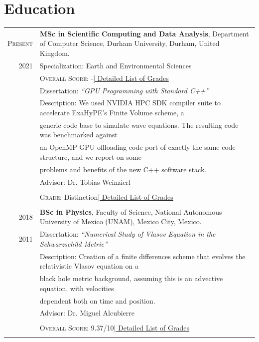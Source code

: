 \documentclass[a4paper,10pt]{article} %
\begin{document}
\section{Education}
\bigskip
\begin{tabular}{r|p{14.5cm}}	
	
	\textsc{Present} & \textbf{MSc in Scientific Computing and Data Analysis}, Department of Computer Science, Durham University, \small Durham, United Kingdom.\\
	\textsc{2021} & Specialization: Earth and Environmental Sciences\\
	&\normalsize \textsc{Overall Score}: -\hyperlink{grdsmsc}{\hfill | \footnotesize Detailed List of Grades}\\
	& Dissertation: \emph{``GPU Programming with Standard C++''}\\ 
	& \small Description: We used NVIDIA HPC SDK compiler suite to accelerate ExaHyPE's Finite Volume scheme, a\\
	&\hspace{1.7cm} \small generic code base to simulate wave equations. The resulting code was benchmarked against\\
	&\hspace{1.7cm} an OpenMP GPU offloading code port of exactly the same code structure, and we report on some\\
	&\hspace{1.7cm} problems and benefits of the new C++ software stack.\\
	& \small Advisor: Dr. Tobias Weinzierl\\
	& \\
	&\normalsize \textsc{Grade}: Distinction\hyperlink{grdsbach}{\hfill | \footnotesize Detailed List of Grades}\\
	\multicolumn{2}{c}{}\\

	
	\textsc{2018} & \textbf{BSc in Physics}, Faculty of Science, National Autonomous University of Mexico (UNAM), \small Mexico City, Mexico.\\
	\textsc{2011} & Dissertation: \emph{``Numerical Study of Vlasov Equation in the Schwarzschild Metric''}\\
	&\small Description: Creation of a finite differences scheme that evolves the relativistic Vlasov equation on a\\
	&\hspace{1.7cm} \small black hole metric background, assuming this is an advective equation, with velocities \\
	&\hspace{1.7cm} \small dependent both on time and position.\\
	& \small Advisor: Dr. Miguel Alcubierre\\
	& \\
	&\normalsize \textsc{Overall Score}: 9.37/10\hyperlink{grdsbach}{\hfill | \footnotesize Detailed List of Grades}\\
	\multicolumn{2}{c}{}\\
	

\end{tabular}
\end{document}
